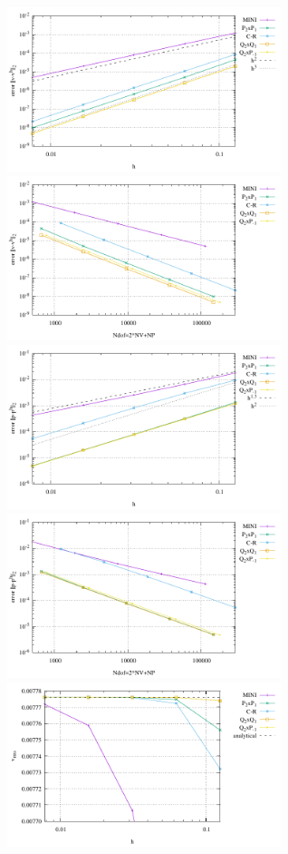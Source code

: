 \begin{center}
\includegraphics[width=8cm]{python_codes/fieldstone_112/results/exp1_rand/errors_V.pdf}
\includegraphics[width=8cm]{python_codes/fieldstone_112/results/exp1_rand/errors_V_ndof.pdf}\\
\includegraphics[width=8cm]{python_codes/fieldstone_112/results/exp1_rand/errors_P.pdf}
\includegraphics[width=8cm]{python_codes/fieldstone_112/results/exp1_rand/errors_P_ndof.pdf}\\
\includegraphics[width=8cm]{python_codes/fieldstone_112/results/exp1_rand/vrms.pdf}

\end{center}
